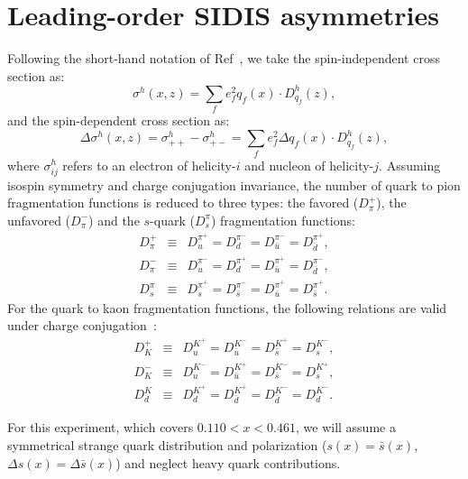 \section{Leading-order SIDIS asymmetries}
Following the  short-hand notation of 
Ref~\cite{leader2}, we take the spin-independent cross section as:
\begin{equation}  
 \sigma^{h} (x,z) = \sum_{f} e_f^2 q_f(x) \cdot D_{q_f}^{h}(z),  
\label{eq:fact2}  
\end{equation}  
and the spin-dependent cross section as:
\begin{equation}  
 \Delta \sigma^{h} (x,z) = \sigma^{h}_{++}-\sigma^{h}_{+-}=
 \sum_{f} e_f^2 \Delta q_f(x) \cdot D_{q_f}^{h}(z),  
\label{eq:qfact2}  
\end{equation}  
where $\sigma^{h}_{ij}$ refers to an electron of helicity-$i$ and nucleon of helicity-$j$.
Assuming isospin symmetry and charge conjugation invariance, the number of quark to pion 
 fragmentation functions is   
reduced to three types: the favored ($D_{\pi}^{+}$), the unfavored ($D_{\pi}^{-}$) 
 and the $s$-quark ($D_s^{\pi}$) fragmentation functions:   
\begin{eqnarray}  
 D_{\pi}^{+} & \equiv & D_{u}^{\pi^+} =D_{d}^{\pi^-}=D_{\bar u}^{\pi^-}=D_{\bar d}^{\pi^+}, \nonumber \\ 
 D_{\pi}^{-} & \equiv & D_{u}^{\pi^-} =D_{d}^{\pi^+}=D_{\bar u}^{\pi^+}=D_{\bar d}^{\pi^-}, \nonumber \\
 D_s^{\pi} & \equiv & D_{s}^{\pi^+} =D_{\bar{s}}^{\pi^-}
=D_{\bar u}^{\pi^+}=D_{\bar s}^{\pi^+}.
\label{eq:fragpi}  
\end{eqnarray} 
For the quark to kaon fragmentation functions, the following relations are valid under charge conjugation~\cite{field}:
\begin{eqnarray}  
 D_{K}^{+} & \equiv & D_{u}^{K^+} =D_{\bar{u}}^{K^-}=D_{\bar{s}}^{K^+}=D_{s}^{K^-}, \nonumber \\ 
 D_{K}^{-} & \equiv & D_{u}^{K^-} =D_{\bar{u}}^{K^+}=D_{\bar{s}}^{K^-}=D_{s}^{K^+}, \nonumber \\
 D_d^{K} & \equiv & D_{d}^{K^+} =D_{\bar{d}}^{K^+}=D_{\bar d}^{K^-}=D_{d}^{K^-}.
\label{eq:fragk}  
\end{eqnarray} 

For this experiment, which covers $0.110<x<0.461$,
 we will assume a symmetrical strange quark distribution and polarization
 ($s(x)=\bar{s}(x)$, $\Delta s(x)=\Delta \bar{s}(x)$) and neglect 
 heavy quark contributions.   

